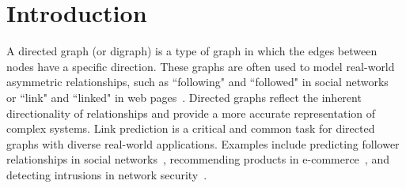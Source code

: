 

\vspace{-6mm}
\section{Introduction}\label{intro}
A directed graph (or digraph) is a type of graph in which the edges between nodes have a specific direction. These graphs are often used to model real-world asymmetric relationships, such as ``following" and ``followed" in social networks~\citep{leskovec2016snap} or ``link" and ``linked" in web pages~\citep{Page1999ThePC}. Directed graphs reflect the inherent directionality of relationships and provide a more accurate representation of complex systems. Link prediction is a critical and common task for directed graphs with diverse real-world applications. Examples include predicting follower relationships in social networks~\cite{liben2003link}, recommending products in e-commerce~\cite{rendle2009bpr}, and detecting intrusions in network security~\cite{bhuyan2013network}.



